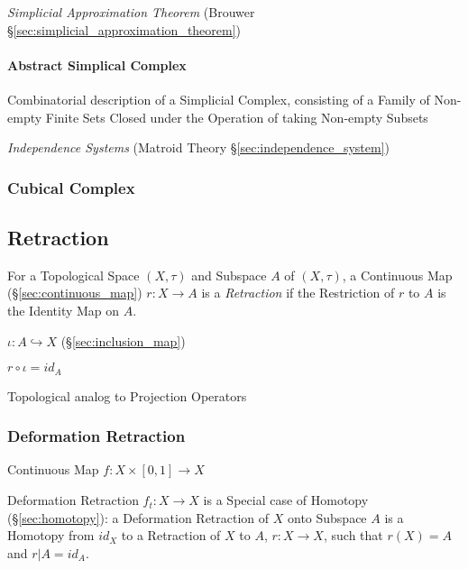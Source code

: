 \emph{Simplicial Approximation Theorem} (Brouwer
\S\ref{sec:simplicial_approximation_theorem})



\paragraph{Abstract Simplical Complex}\label{sec:abstract_complex}\hfill

Combinatorial description of a Simplicial Complex, consisting of a Family of
Non-empty Finite Sets Closed under the Operation of taking Non-empty Subsets

\fist \emph{Independence Systems} (Matroid Theory
\S\ref{sec:independence_system})



\subsubsection{Cubical Complex}\label{sec:cubical_complex}



\subsection{Retraction}\label{sec:subspace_retraction}

For a Topological Space $(X, \tau)$ and Subspace $A$ of $(X,\tau)$, a
Continuous Map (\S\ref{sec:continuous_map}) $r : X \rightarrow A$ is a
\emph{Retraction} if the Restriction of $r$ to $A$ is the Identity Map
on $A$.

$\iota : A \hookrightarrow X$ (\S\ref{sec:inclusion_map})

$r \circ \iota = id_A$

Topological analog to Projection Operators %
\cite{hatcher02}



\subsubsection{Deformation Retraction}\label{sec:deformation_retraction}

Continuous Map $f : X \times [0,1] \rightarrow X$

Deformation Retraction $f_t : X \rightarrow X$ is a Special case of
Homotopy (\S\ref{sec:homotopy}): a Deformation Retraction of $X$ onto
Subspace $A$ is a Homotopy from $id_X$ to a Retraction of $X$ to $A$,
$r : X \rightarrow X$, such that $r(X) = A$ and $r | A = id_A$.
\cite{hatcher02}



